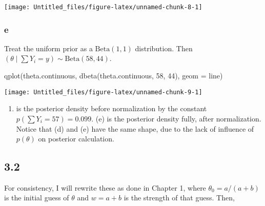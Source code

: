 \documentclass[
]{article}
\newenvironment{Shaded}{\begin{snugshade}}{\end{snugshade}}
\newcommand{\AttributeTok}[1]{\textcolor[rgb]{0.77,0.63,0.00}{#1}}
\newcommand{\DecValTok}[1]{\textcolor[rgb]{0.00,0.00,0.81}{#1}}
\newcommand{\FunctionTok}[1]{\textcolor[rgb]{0.00,0.00,0.00}{#1}}
\newcommand{\NormalTok}[1]{#1}
\newcommand{\StringTok}[1]{\textcolor[rgb]{0.31,0.60,0.02}{#1}}
\providecommand{\tightlist}{%
  \setlength{\itemsep}{0pt}\setlength{\parskip}{0pt}}
\begin{document}
\begin{center}\texttt{[image: Untitled\_files/figure-latex/unnamed-chunk-8-1]} \end{center}

\hypertarget{e}{%
\subsubsection{e}\label{e}}

Treat the uniform prior as a \(\text{Beta}(1, 1)\) distribution. Then
\(\left( \theta \mid \sum Y_i = y \right) \sim \text{Beta}(58, 44)\).

\begin{Shaded}
\begin{Highlighting}[]
\FunctionTok{qplot}\NormalTok{(theta.continuous, }\FunctionTok{dbeta}\NormalTok{(theta.continuous, }\DecValTok{58}\NormalTok{, }\DecValTok{44}\NormalTok{), }\AttributeTok{geom =} \StringTok{\textquotesingle{}line\textquotesingle{}}\NormalTok{)}
\end{Highlighting}
\end{Shaded}

\begin{center}\texttt{[image: Untitled\_files/figure-latex/unnamed-chunk-9-1]} \end{center}

\begin{enumerate}
\def\labelenumi{(\alph{enumi})}
\setcounter{enumi}{3}
\tightlist
\item
  is the posterior density before normalization by the constant
  \(p(\sum Y_i = 57) = 0.099\). (e) is the posterior density fully,
  after normalization. Notice that (d) and (e) have the same shape, due
  to the lack of influence of \(p(\theta)\) on posterior calculation.
\end{enumerate}

\hypertarget{section-1}{%
\subsection{3.2}\label{section-1}}

For consistency, I will rewrite these as done in Chapter 1, where
\(\theta_0 = a / (a + b)\) is the initial guess of \(\theta\) and
\(w = a + b\) is the strength of that guess. Then,
\end{document}
